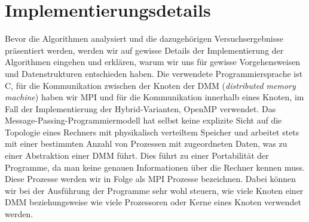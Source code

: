 \documentclass[11pt,a4paper]{article}
\begin{document}
\section{Implementierungsdetails}
\label{sec:details}
Bevor die Algorithmen analysiert und die dazugehörigen Versuchsergebnisse präsentiert werden, werden wir auf gewisse Details der Implementierung der Algorithmen eingehen und erklären, warum wir uns für gewisse Vorgehensweisen und Datenstrukturen entschieden haben. Die verwendete Programmiersprache ist C, für die Kommunikation zwischen der Knoten der DMM (\textit{distributed memory machine}) haben wir MPI und für die Kommunikation innerhalb eines Knoten, im Fall der Implementierung der Hybrid-Varianten, OpenMP verwendet. Das Message-Passing-Programmiermodell hat selbst keine explizite Sicht auf die Topologie eines Rechners mit physikalisch verteiltem Speicher und arbeitet stets mit einer bestimmten Anzahl von Prozessen mit zugeordneten Daten, was zu einer Abstraktion einer DMM führt. Dies führt zu einer Portabilität der Programme, da man keine genauen Informationen über die Rechner kennen muss.\\
Diese Prozesse werden wir in Folge als MPI Prozesse bezeichnen. Dabei können wir bei der Ausführung der Programme sehr wohl steuern, wie viele Knoten einer DMM beziehungsweise wie viele Prozessoren oder Kerne eines Knoten verwendet werden.
\end{document}
